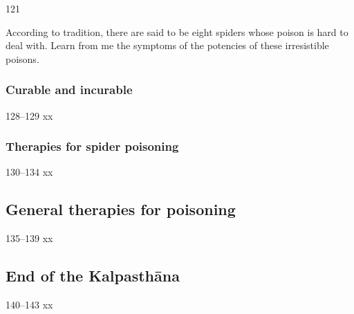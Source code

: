 \begin{translation}
\item[121]

According to tradition, there are said to be eight spiders whose poison
is hard to deal with.  Learn from me the symptoms of the potencies of these 
irresistible poisons.
 
 

 
 
 \subsubsection{Curable and incurable}
 
 \item[128--129] xx
 
 \subsubsection{Therapies for spider poisoning}
 
 \item [130--134] xx
 
\subsection{General therapies for poisoning}

\item [135--139] xx

\subsection{End of the Kalpasthāna}

\item[140--143] xx
 
\end{translation}